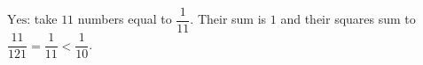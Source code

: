 $\boxed{\text{Yes}}$: take $11$ numbers equal to $\dfrac1{11}$. Their sum is $1$ and their squares sum to $\dfrac{11}{121}=\dfrac1{11}<\dfrac1{10}$.
